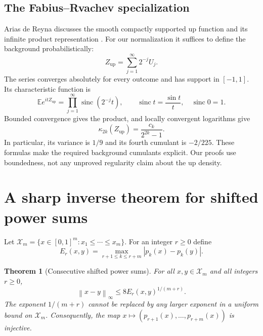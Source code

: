 \documentclass[11pt,a4paper]{article}
\numberwithin{equation}{section}
\newtheorem{theorem}{Theorem}[section]
\theoremstyle{definition}
\theoremstyle{remark}
\newcommand{\E}{\mathbb E}
\newcommand{\norm}[1]{\left\lVert#1\right\rVert}
\newcommand{\sinc}{\operatorname{sinc}}
\newcommand{\kap}{\kappa}
\newcommand{\Xs}{\mathcal X_m}
\begin{document}
\subsection{The Fabius--Rvachev specialization}
Arias de Reyna discusses the smooth compactly supported up function and its
infinite product representation \cite{Arias}. For our normalization it suffices
to define the background probabilistically:
\begin{equation}
 Z_{\mathrm{up}}=\sum_{j=1}^{\infty}2^{-j}U_j.
 \label{eq:up}
\end{equation}
The series converges absolutely for every outcome and has support in $[-1,1]$.
Its characteristic function is
\begin{equation}
 \E e^{itZ_{\mathrm{up}}}=\prod_{j=1}^{\infty}\sinc(2^{-j}t),
 \qquad \sinc t=\frac{\sin t}{t},\quad\sinc0=1.
\end{equation}
Bounded convergence gives the product, and locally convergent logarithms give
\begin{equation}
 \kap_{2k}(Z_{\mathrm{up}})=\frac{c_k}{2^{2k}-1}.
 \label{eq:upcumulants}
\end{equation}
In particular, its variance is $1/9$ and its fourth cumulant is $-2/225$.
These formulas make the required background cumulants explicit. Our proofs
use boundedness, not any unproved regularity claim about the up density.

\section{A sharp inverse theorem for shifted power sums}
\label{sec:shifted}

Let $\Xs=\{x\in[0,1]^m:x_1\le\cdots\le x_m\}$. For an integer $r\ge0$ define
\begin{equation}
 E_r(x,y)=\max_{r+1\le k\le r+m}|p_k(x)-p_k(y)|.
\end{equation}

\begin{theorem}[Consecutive shifted power sums]
\label{thm:shifted}
For all $x,y\in\Xs$ and all integers $r\ge0$,
\begin{equation}
 \norm{x-y}_\infty\le 8 E_r(x,y)^{1/(m+r)}.
 \label{eq:shifted}
\end{equation}
The exponent $1/(m+r)$ cannot be replaced by any larger exponent in a uniform
bound on $\Xs$. Consequently, the map
$x\mapsto(p_{r+1}(x),\ldots,p_{r+m}(x))$ is injective.
\end{theorem}
\end{document}
